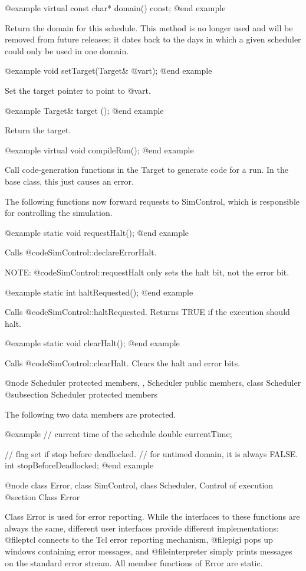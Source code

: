 @example
virtual const char* domain() const;
@end example

Return the domain for this schedule.  This method is no longer used and
will be removed from future releases; it dates back to the days
in which a given scheduler could only be used in one domain.

@example
void setTarget(Target& @var{t});
@end example

Set the target pointer to point to @var{t}.

@example
Target& target ();
@end example

Return the target.

@example
virtual void compileRun();
@end example

Call code-generation functions in the Target to generate
code for a run.
In the base class, this just causes an error.

The following functions now forward requests to SimControl,
which is responsible for controlling the simulation.

@example
static void requestHalt();
@end example

Calls @code{SimControl::declareErrorHalt}.

NOTE: @code{SimControl::requestHalt} only sets the halt bit,
not the error bit.

@example
static int haltRequested();
@end example

Calls @code{SimControl::haltRequested}.  Returns TRUE if the
execution should halt.

@example
static void clearHalt();
@end example

Calls @code{SimControl::clearHalt}.  Clears the halt and error
bits.

@node Scheduler protected members,  , Scheduler public members, class Scheduler
@subsection Scheduler protected members

The following two data members are protected.

@example
// current time of the schedule
double currentTime;

// flag set if stop before deadlocked.
// for untimed domain, it is always FALSE.
int stopBeforeDeadlocked;
@end example

@node class Error, class SimControl, class Scheduler, Control of execution
@section Class Error

Class Error is used for error reporting.  While the interfaces to
these functions are always the same, different user interfaces provide
different implementations: @file{ptcl} connects to the Tcl error
reporting mechanism, @file{pigi} pops up windows containing error
messages, and @file{interpreter} simply prints messages on the standard
error stream.  All member functions of Error are static.

